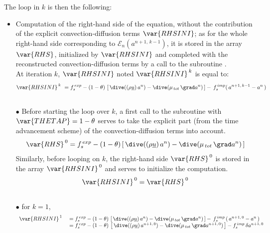 The loop in $k$ is then the following:
\begin{itemize}
\item Computation of the right-hand side of the equation, without the contribution of
the explicit convection-diffusion terms $\var{RHSINI}$; as for the whole right-hand side corresponding
to $\mathcal{E}_{n}(a^{n+1,\,k-1})$, it is stored in the array $\var{RHS}$,
initialized by $\var{RHSINI}$ and completed with the reconstructed
convection-diffusion terms by a call to the subroutine .\\
At iteration $k$, $\var{RHSINI}$ noted  $\var{RHSINI}^{\,k}$ is equal to:\\
\begin{equation}\notag
\var{RHSINI}^{\,k}\  = f_s^{\,exp}-(1-\theta)\,\left[\,\dive((\rho \underline{u})\,a^n) - \dive(\mu_{\,tot}\,\grad a^n)\,\right]-\,f_s^{\,imp}(\,a^{n+1,\,k-1} - a^n\,) \\
\end{equation}
\\
$\bullet$ Before starting the loop over $k$, a first call to the subroutine  with $\var{THETAP}=1-\theta$ serves to take the explicit part (from the time advancement scheme) of the convection-diffusion terms into account.
\begin{equation}\notag
\displaystyle
\var{RHS}^{\,0} = f_s^{\,exp} -(1-\theta)\,[\,\dive((\rho \underline{u})\,a^n) - \dive(\mu_{\,tot}\,\grad a^n)\,]\\
\end{equation}
Similarly, before looping on $k$, the right-hand side $\var{RHS}^{\,0}$ is stored in the array $\var{RHSINI}^{\,0}$ and serves to initialize the computation.
\begin{equation}\notag
\var{RHSINI}^{\,0} =\var{RHS}^{\,0}
\end{equation}
\\
$\bullet$ for $k = 1$,
\begin{equation}\notag
\begin{array}{ll}
\var{RHSINI}^{\,1}\ &=f_s^{\,exp}-(1-\theta)\,\left[\,\dive((\rho \underline{u})\,a^n) - \dive(\mu_{\,tot}\,\grad a^n)\,\right]-\,f_s^{\,imp}\,(\,a^{n+1,\,0} - a^n\,)\\
&=f_s^{\,exp}- (1-\theta)\,\left[\,\dive((\rho \underline{u})\,a^{n+1,\,0}) - \dive(\mu_{\,tot}\,\grad a^{n+1,\,0})\,\right]-f_s^{\,imp}\,\delta a^{n+1,\,0} \\
\end{array}
\end{equation}

\end{itemize}
